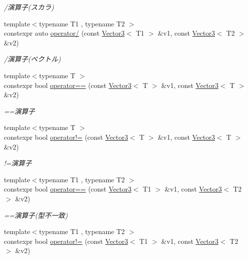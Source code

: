 \begin{DoxyCompactItemize}
\begin{DoxyCompactList}\small\item\em /演算子(スカラ) \end{DoxyCompactList}\item 
{\footnotesize template$<$typename T1 , typename T2 $>$ }\\constexpr auto \mbox{\hyperlink{namespacesaki_a7af3750f8a88499eca7784ad18753111}{operator/}} (const \mbox{\hyperlink{classsaki_1_1_vector3}{Vector3}}$<$ T1 $>$ \&v1, const \mbox{\hyperlink{classsaki_1_1_vector3}{Vector3}}$<$ T2 $>$ \&v2)
\begin{DoxyCompactList}\small\item\em /演算子(ベクトル) \end{DoxyCompactList}\item 
{\footnotesize template$<$typename T $>$ }\\constexpr bool \mbox{\hyperlink{namespacesaki_a29747cf04c5a821834f7a1fea39e4050}{operator==}} (const \mbox{\hyperlink{classsaki_1_1_vector3}{Vector3}}$<$ T $>$ \&v1, const \mbox{\hyperlink{classsaki_1_1_vector3}{Vector3}}$<$ T $>$ \&v2)
\begin{DoxyCompactList}\small\item\em ==演算子 \end{DoxyCompactList}\item 
{\footnotesize template$<$typename T $>$ }\\constexpr bool \mbox{\hyperlink{namespacesaki_a49b3805c2b97e135606939b8d64eca20}{operator!=}} (const \mbox{\hyperlink{classsaki_1_1_vector3}{Vector3}}$<$ T $>$ \&v1, const \mbox{\hyperlink{classsaki_1_1_vector3}{Vector3}}$<$ T $>$ \&v2)
\begin{DoxyCompactList}\small\item\em !=演算子 \end{DoxyCompactList}\item 
{\footnotesize template$<$typename T1 , typename T2 $>$ }\\constexpr bool \mbox{\hyperlink{namespacesaki_a487f0b513be6d4a0aecafeec28b6fc69}{operator==}} (const \mbox{\hyperlink{classsaki_1_1_vector3}{Vector3}}$<$ T1 $>$ \&v1, const \mbox{\hyperlink{classsaki_1_1_vector3}{Vector3}}$<$ T2 $>$ \&v2)
\begin{DoxyCompactList}\small\item\em ==演算子(型不一致) \end{DoxyCompactList}\item 
{\footnotesize template$<$typename T1 , typename T2 $>$ }\\constexpr bool \mbox{\hyperlink{namespacesaki_a26df5bd85b044f8556c4e258479b54f7}{operator!=}} (const \mbox{\hyperlink{classsaki_1_1_vector3}{Vector3}}$<$ T1 $>$ \&v1, const \mbox{\hyperlink{classsaki_1_1_vector3}{Vector3}}$<$ T2 $>$ \&v2)

\end{DoxyCompactItemize}
